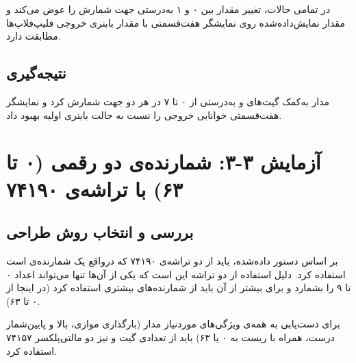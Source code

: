 \documentclass[12pt,a4paper]{article}
\begin{document}
در تمامی حالات، تغییر مقدار  بین ۰ و ۱ به‌درستی جهت شمارش را عوض می‌کند و مقدار نمایش‌داده‌شده روی نمایشگر هفت‌قسمتی با مقدار باینری خروجی فلیپ‌فلاپ‌ها مطابقت دارد.

\subsection{نتیجه‌گیری}
مدار به‌کمک گیت‌های  و  به‌درستی از ۰ تا ۷ در هر دو جهت شمارش کرد و نمایشگر هفت‌قسمتی  خوانایی خروجی را نسبت به حالت باینری اولیه بهبود داد.

\newpage

\section{آزمایش ۳-۳: شمارنده‌ی دو رقمی  (۰ تا ۶۳) با تراشه‌ی ۷۴۱۹۰}


\subsection{بررسی و انتخاب روش طراحی}
بر اساس دستور داده‌شده، باید از دو تراشه‌ی ۷۴۱۹۰ که درواقع یک شمارنده‌ی  است استفاده کرد. دلیل استفاده از دو تراشه این است که یکی از آن‌ها تنها می‌تواند اعداد ۰ تا ۹ را بشمارد و برای بیشتر از آن باید از شمارنده‌های بیشتری استفاده کرد (در اینجا از ۰ تا ۶۳).

برای دست‌یابی به همه‌ی ویژگی‌های موردنیاز مدار (بارگذاری موازی، بالا و پایین‌شمار درست، همراه با ریست به ۰ یا ۶۳) باید از تعدادی گیت و نیز دو مالتی‌پلکسر ۷۴۱۵۷ استفاده کرد.
\end{document}
